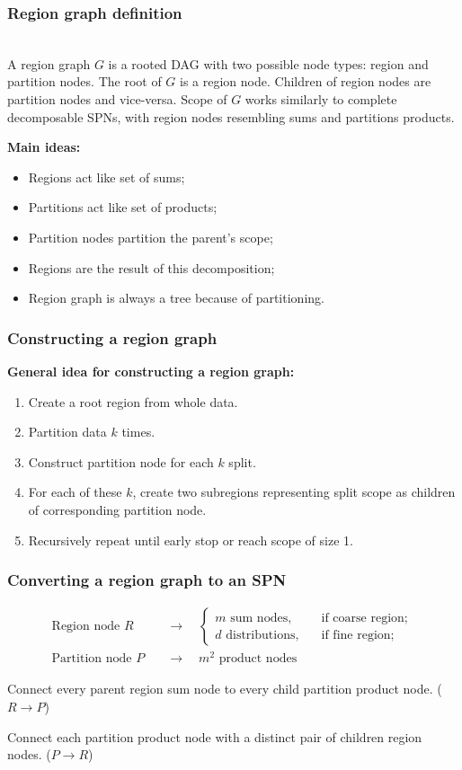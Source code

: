 \documentclass[usenames,dvipsnames]{beamer}
\begin{document}
\begin{frame}
  \frametitle{Region graph definition}

  \begin{definition}~\\
    A region graph $G$ is a rooted DAG with two possible node types: region and partition nodes.
    The root of $G$ is a region node. Children of region nodes are partition nodes and vice-versa.
    Scope of $G$ works similarly to complete decomposable SPNs, with region nodes resembling sums
    and partitions products.
  \end{definition}

  \textbf{Main ideas:}
  \begin{itemize}
    \item Regions act like set of sums;
    \item Partitions act like set of products;
    \item Partition nodes partition the parent's scope;
    \item Regions are the result of this decomposition;
    \item Region graph is always a tree because of partitioning.
  \end{itemize}
\end{frame}

\begin{frame}
  \frametitle{Constructing a region graph}

  \textbf{General idea for constructing a region graph:}
  \begin{enumerate}
    \item Create a root region from whole data.
    \item Partition data $k$ times.
    \item Construct partition node for each $k$ split.
    \item For each of these $k$, create two subregions representing split scope as children of
      corresponding partition node.
    \item Recursively repeat until early stop or reach scope of size 1.
  \end{enumerate}
\end{frame}

\begin{frame}
  \frametitle{Converting a region graph to an SPN}

  \begin{align*}
    \text{Region node }R\quad &\longrightarrow\quad
    \begin{cases}
      m\text{ sum nodes,} & \quad \text{if coarse region;}\\
      d\text{ distributions,} & \quad \text{if fine region};
    \end{cases}~\\
    \text{Partition node }P\quad &\longrightarrow\quad m^2\text{ product nodes}
  \end{align*}

  Connect every parent region sum node to every child partition product node. ($R\to P$)

  Connect each partition product node with a distinct pair of children region nodes. ($P\to R$)
\end{frame}
\end{document}
